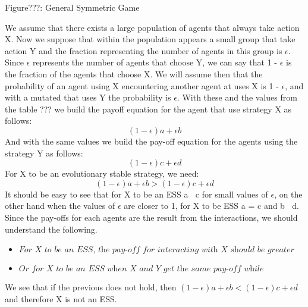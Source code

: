 \documentclass{article}
\begin{document}
\begin{center}
	Figure???: General Symmetric Game
\end{center}
We assume that there exists a large population of agents that always take action X. Now we suppose that within the population appears a small group that take action Y and the   fraction representing the number of agents in this group is $\epsilon$.  Since $\epsilon$ represents the number of agents that choose Y, we can say that 1 - $\epsilon$ is the fraction of the agents that choose X.  We will assume then that the probability of an agent using X encountering another agent at uses X is 1 - $\epsilon$, and with a mutated that uses Y the probability is $\epsilon$.  With these and the values from the table ??? we build the payoff equation for the agent that use strategy X as follows:
\begin{equation}
(1-{\epsilon})a + {\epsilon}b
\end{equation}
And with the same values we build the pay-off equation for the agents using the strategy Y as follows:
\begin{equation}
(1-{\epsilon})c + {\epsilon}d
\end{equation}
For X to be an evolutionary stable strategy, we need:
\begin{equation}
(1-{\epsilon})a + {\epsilon}b > (1-{\epsilon})c + {\epsilon}d
\end{equation}
It should be easy to see that for X to be an ESS a $\>$ c for small values of $\epsilon$, on the other hand when the values of $\epsilon$ are closer to 1, for X to be ESS a = c and b $\>$ d.
Since the pay-offs for each agents are the result from the interactions, we should understand the following.
\begin{itemize}
\item $\textit{For X to be an ESS, the pay-off for interacting with X should be greater or at least equal to the pay-off that an Y gets when interacting with X.}$ 
\item $\textit{Or for X to be an ESS when X and Y get the same pay-off while interacting with X, X needs to get a better pay-off when interacting with Y than Y interacting with Y.}$ 
\end{itemize}
We see that if the previous does not hold, then $(1-{\epsilon})a + {\epsilon}b < (1-{\epsilon})c + {\epsilon}d$ and therefore X is not an ESS.
\end{document}
